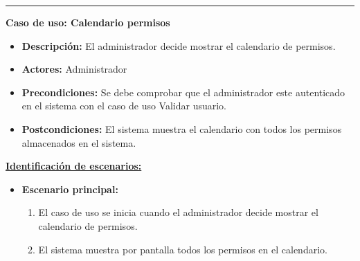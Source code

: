 \smallskip
\hrule height 1pt
\smallskip
\textbf{Caso de uso: Calendario permisos}
\begin{itemize}\renewcommand{\labelitemi}{$\cdot$}
 \item \textbf{Descripción:} El administrador decide mostrar el calendario de permisos.
  \item \textbf{Actores:} Administrador
  \item \textbf{Precondiciones:} Se debe comprobar que el administrador este autenticado en el sistema con el caso de uso Validar usuario.
  \item \textbf{Postcondiciones:} El sistema muestra el calendario con todos los permisos almacenados en el sistema.
\end{itemize}
\underline{\textbf{Identificación de escenarios:}}
\begin{itemize}\renewcommand{\labelitemi}{$\circ$}
 \item \textbf{Escenario principal:}
         \begin{enumerate}
          \item El caso de uso se inicia cuando el administrador decide mostrar el calendario de permisos.
	  \item El sistema muestra por pantalla todos los permisos en el calendario.
         \end{enumerate}
\end{itemize}

